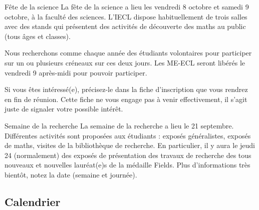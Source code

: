 \documentclass{beamer}
\begin{document}
\begin{frame}{Fête de la science}
La fête de la science a lieu les vendredi 8 octobre et samedi 9 octobre, à la faculté des sciences.
L'IECL dispose habituellement de trois salles avec des stands qui présentent des activités de découverte des maths au public (tous âges et classes).

Nous recherchons comme chaque année des étudiants volontaires pour participer sur un ou plusieurs créneaux sur ces deux jours.
Les ME-ECL seront libérés le vendredi 9 après-midi pour pouvoir participer.

Si vous êtes intéressé(e), précisez-le dans la fiche d'inscription que vous rendrez en fin de réunion.
Cette fiche ne vous engage pas à venir effectivement, il s'agit juste de signaler votre possible intérêt.

\end{frame}
 
 
\begin{frame}{Semaine de la recherche}
La semaine de la recherche a lieu le 21 septembre.
Différentes activités sont proposées aux étudiants : exposés généralistes, exposés de maths, visites de la bibliothèque de recherche.
En particulier, il y aura le jeudi 24 (normalement) des exposés de présentation des travaux de recherche des tous nouveaux et nouvelles lauréat(e)s de la médaille Fields.
Plus d'informations très bientôt, notez la date (semaine et journée).

\end{frame}

\subsection{Calendrier}




\end{document}
